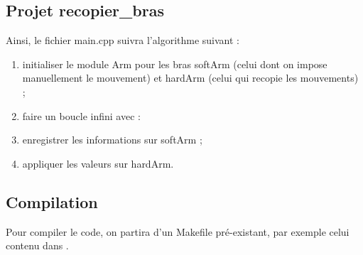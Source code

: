 \documentclass[conference]{IEEEtran}
\begin{document}





\subsection{Projet recopier\_bras}

Ainsi, le fichier main.cpp suivra l'algorithme suivant :
\begin{enumerate}
    \item initialiser le module Arm pour les bras softArm (celui dont on impose manuellement le mouvement) et hardArm (celui qui recopie les mouvements) ;
    \item faire un boucle infini avec :
    \item enregistrer les informations sur softArm ;
    \item appliquer les valeurs sur hardArm.
\end{enumerate}


\subsection{Compilation}

Pour compiler le code, on partira d'un Makefile pré-existant, par exemple celui contenu dans .

\end{document}
